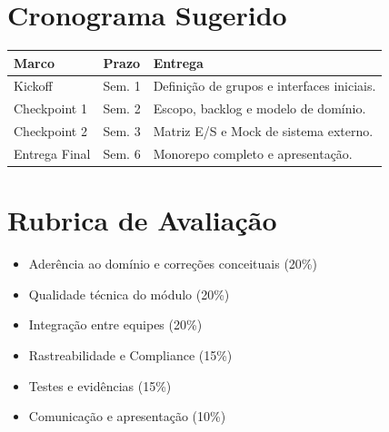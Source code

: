 \documentclass[a4paper,12pt]{article}
\begin{document}
\section{Cronograma Sugerido}
\begin{tabularx}{\textwidth}{l l X}
\toprule
\textbf{Marco} & \textbf{Prazo} & \textbf{Entrega} \\ \midrule
Kickoff & Sem. 1 & Definição de grupos e interfaces iniciais. \\
Checkpoint 1 & Sem. 2 & Escopo, backlog e modelo de domínio. \\
Checkpoint 2 & Sem. 3 & Matriz E/S e Mock de sistema externo. \\
Entrega Final & Sem. 6 & Monorepo completo e apresentação. \\ \bottomrule
\end{tabularx}

\section{Rubrica de Avaliação}
\begin{itemize}
    \item Aderência ao domínio e correções conceituais (20\%)
    \item Qualidade técnica do módulo (20\%)
    \item Integração entre equipes (20\%)
    \item Rastreabilidade e Compliance (15\%)
    \item Testes e evidências (15\%)
    \item Comunicação e apresentação (10\%)
\end{itemize}

\bigskip
\begin{center}
\end{center}
\end{document}
